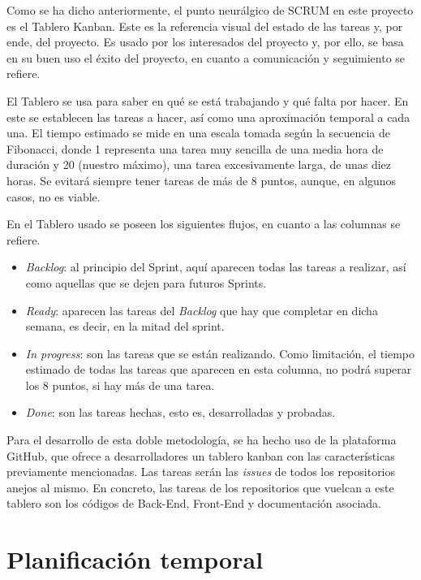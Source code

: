 Como se ha dicho anteriormente, el punto neurálgico de SCRUM en este proyecto es el Tablero Kanban. Este es la referencia visual del estado de las tareas y, por ende, del proyecto. Es usado por los interesados del proyecto y, por ello, se basa en su buen uso el éxito del proyecto, en cuanto a comunicación y seguimiento se refiere.


El Tablero se usa para saber en qué se está trabajando y qué falta por hacer. En este se establecen las tareas a hacer, así como una aproximación temporal a cada una. El tiempo estimado se mide en una escala tomada según la secuencia de Fibonacci, donde 1 representa una tarea muy sencilla de una media hora de duración y 20 (nuestro máximo), una tarea excesivamente larga, de unas diez horas. Se evitará siempre tener tareas de más de 8 puntos, aunque, en algunos casos, no es viable.

En el Tablero usado se poseen los siguientes flujos, en cuanto a las columnas se refiere.
\begin{itemize}
    \item \textit{Backlog}: al principio del Sprint, aquí aparecen todas las tareas a realizar, así como aquellas que se dejen para futuros Sprints.
    \item \textit{Ready}: aparecen las tareas del \textit{Backlog} que hay que completar en dicha semana, es decir, en la mitad del sprint.
    \item \textit{In progress}: son las tareas que se están realizando. Como limitación, el tiempo estimado de todas las tareas que aparecen en esta columna, no podrá superar los 8 puntos, si hay más de una tarea.
    \item \textit{Done}: son las tareas hechas, esto es, desarrolladas y probadas.
\end{itemize}

Para el desarrollo de esta doble metodología, se ha hecho uso de la plataforma GitHub, que ofrece a desarrolladores un tablero kanban con las características previamente mencionadas. Las tareas serán las \textit{issues} de todos los repositorios anejos al mismo. En concreto, las tareas de los repositorios que vuelcan a este tablero son los códigos de Back-End, Front-End y documentación asociada.


\section{Planificación temporal}\label{sec:planificacion_temporal}

